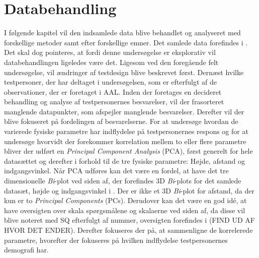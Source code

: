\chapter{Databehandling}
\label{TestAfSkalaDatabehandling}
%
I følgende kapitel vil den indsamlede data blive behandlet og analyseret med forskellige metoder samt efter forskellige emner. Det samlede data forefindes i . Det skal dog pointeres, at fordi denne undersøgelse er eksplorativ vil databehandlingen ligeledes være det. Ligesom ved den foregående felt undersøgelse, vil ændringer af testdesign blive beskrevet først. Dernæst hvilke testpersoner, der har deltaget i undersøgelsen, som er efterfulgt af de observationer, der er foretaget i AAL. Inden der foretages en decideret behandling og analyse af testpersonernes besvarelser, vil der frasorteret manglende datapunkter, som afspejler manglende besvarelser. Derefter vil der blive fokuseret på fordelingen af besvarelserne. For at undersøge hvordan de varierede fysiske parametre har indflydelse på testpersonernes respons og for at undersøge hvorvidt der forekommer korrelation mellem to eller flere parametre bliver der udført en \textit{Principal Component Analysis} (PCA), først generelt for hele datasættet og derefter i forhold til de tre fysiske parametre: Højde, afstand og indgangsvinkel. Når PCA udføres kan det være en fordel, at have det tre dimensionelle \textit{Bi}-plot ved siden af, der forefindes 3D \textit{Bi}-plots for det samlede datasæt, højde og indgangsvinkel i . Der er ikke et 3D \textit{Bi}-plot for afstand, da der kun er to \textit{Principal Components} (PCs). Derudover kan det være en god idé, at have oversigten over skala spørgsmålene og skalaerne ved siden af, da disse vil blive noteret med SQ efterfulgt af nummer, oversigten forefindes i (FIND UD AF HVOR DET ENDER). Derefter fokuseres der på, at sammenligne de korrelerede parametre, hvorefter der fokuseres på hvilken indflydelse testpersonernes demografi har.        
